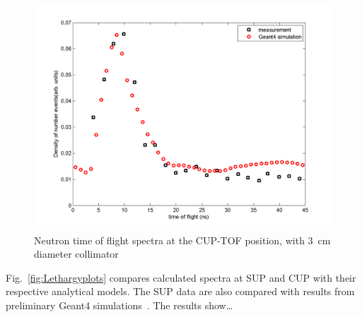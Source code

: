 \documentclass[11pt,a4paper]{IEEEtran}
\let\MYoriglatexcaption\caption
\renewcommand{\caption}[2][\relax]{\MYoriglatexcaption[#2]{#2}}
\begin{document}
\begin{figure}[t]
    \includegraphics[width=\columnwidth]{CUPTOFtofspectraRADECS.png}
    \caption{
        Neutron time of flight spectra at the CUP-TOF position, with \SI{3}{\cm} diameter collimator
        }
    \label{fig:TOFSpectra}
\end{figure}

Fig.~\ref{fig:Lethargyplots} compares calculated spectra at SUP and CUP with their respective analytical models.
The SUP data are also compared with results from preliminary Geant4 simulations~\cite{Platt2013}.
The results show\ldots
{}
\end{document}
